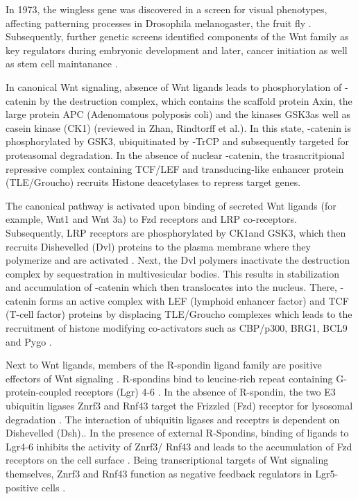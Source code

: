\begin{flushleft}
In 1973, the wingless gene was discovered in a screen for visual phenotypes, affecting patterning processes in Drosophila melanogaster, the fruit fly \cite{Sharma1973WinglessMelanogaster.}. Subsequently, further genetic screens identified components of the Wnt family as key regulators during embryonic development and later, cancer initiation as well as stem cell maintanance  \cite{Nusslein-Volhard1980MutationsDrosophila}. \par 

In canonical Wnt signaling, absence of Wnt ligands leads to phosphorylation of \textbeta-catenin by the destruction complex, which contains the scaffold protein Axin, the large protein APC (Adenomatous polyposis coli) and the kinases GSK3\textbeta as well as casein kinase (CK1\textalpha) (reviewed in Zhan, Rindtorff et al.\cite{Zhan2017}). 
In this state, \textbeta-catenin is phosphorylated by GSK3\textbeta, ubiquitinated by \textbeta-TrCP and subsequently targeted for proteasomal degradation. 
In the absence of nuclear \textbeta-catenin, the trasncritpional repressive complex containing TCF/LEF and transducing-like enhancer protein (TLE/Groucho) recruits Histone deacetylases to repress target genes. \par 

The canonical pathway is activated upon binding of secreted Wnt ligands (for example, Wnt1 and Wnt 3a) to Fzd receptors and LRP co-receptors. 
Subsequently, LRP receptors are  phosphorylated by CK1\textalpha and GSK3\textbeta, which then recruits Dishevelled (Dvl) proteins to the plasma membrane where they polymerize and are activated \cite{Metcalfe2011}. Next, the Dvl polymers inactivate the destruction complex by sequestration in multivesicular bodies. This results in stabilization and accumulation of \textbeta-catenin which then translocates into the nucleus. There, \textbeta-catenin forms an active complex with LEF (lymphoid enhancer factor) and TCF (T-cell factor) proteins by displacing TLE/Groucho complexes which leads to the recruitment of histone modifying co-activators such as CBP/p300, BRG1, BCL9 and Pygo \cite{Lien2014WntSignaling}. \par 

Next to Wnt ligands, members of the R-spondin ligand family are positive effectors of Wnt signaling \cite{Kazanskaya2004, Glinka2011, Hao2012}. R-spondins bind to leucine-rich repeat containing G-protein-coupled receptors (Lgr) 4-6 \cite{Koo2012a}. In the absence of R-spondin, the two E3 ubiquitin ligases Znrf3 and Rnf43 target the Frizzled (Fzd) receptor for lysosomal degradation \cite{DeLau2011}. The interaction of ubiquitin ligases and receptrs is dependent on Dishevelled (Dsh).\cite{Jiang2015}. In the presence of external R-Spondins, binding of ligands to Lgr4-6 inhibits the activity of Znrf3/ Rnf43 and leads to the accumulation of Fzd receptors on the cell surface \cite{Hao2012, Koo2012a}. Being transcriptional targets of Wnt signaling themselves, Znrf3 and Rnf43 function as negative feedback regulators in Lgr5- positive cells \cite{DeLau2012}. \par 


\end{flushleft}
